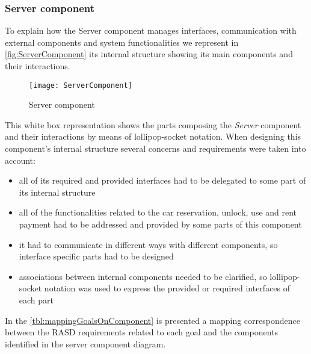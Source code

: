 \subsubsection{Server component}
To explain how the Server component manages interfaces, communication with external components and system functionalities we represent in \autoref{fig:ServerComponent} its internal structure showing its main components and their interactions.
\\

\begin{figure}[h]
			\centering
			\texttt{[image: ServerComponent]}
			\caption{
				\label{fig:ServerComponent} 
				Server component
			}
		\end{figure}
\clearpage

This white box representation shows the parts composing the \emph{Server} component and their interactions by means of lollipop-socket notation. When designing this component's internal structure several concerns and requirements were taken into account:
\begin{itemize}
	\item all of its required and provided interfaces had to be delegated to some part of its internal structure
	\item all of the functionalities related to the car reservation, unlock, use and rent payment had to be addressed and provided by some parts of this component
	\item it had to communicate in different ways with different components, so interface specific parts had to be designed
	\item associations between internal components needed to be clarified, so lollipop-socket notation was used to express the provided or required interfaces of each part
\end{itemize}



In the \autoref{tbl:mappingGoalsOnComponent} is presented a mapping correspondence between the RASD requirements related to each goal and the components identified in the server component diagram.  \\

